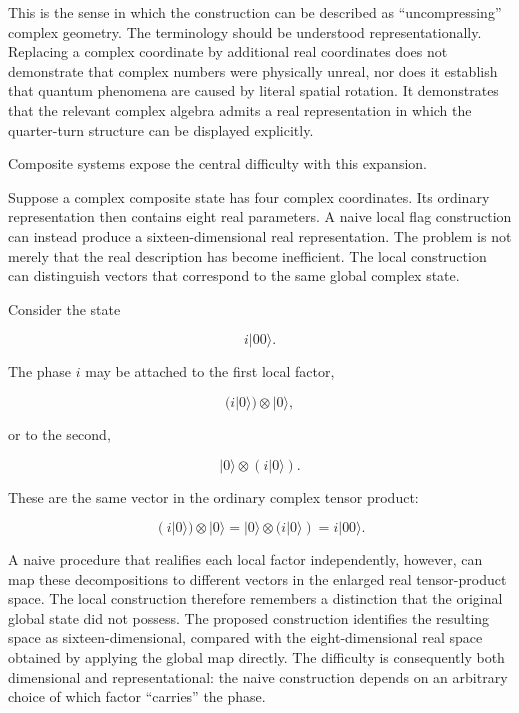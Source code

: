\documentclass[11pt]{article}
\begin{document}
This is the sense in which the construction can be described as ``uncompressing'' complex geometry. The terminology should be understood representationally. Replacing a complex coordinate by additional real coordinates does not demonstrate that complex numbers were physically unreal, nor does it establish that quantum phenomena are caused by literal spatial rotation. It demonstrates that the relevant complex algebra admits a real representation in which the quarter-turn structure can be displayed explicitly.

Composite systems expose the central difficulty with this expansion.

Suppose a complex composite state has four complex coordinates. Its ordinary representation then contains eight real parameters. A naive local flag construction can instead produce a sixteen-dimensional real representation. The problem is not merely that the real description has become inefficient. The local construction can distinguish vectors that correspond to the same global complex state.

Consider the state

\begin{equation}
i|00\rangle.
\end{equation}

The phase $i$ may be attached to the first local factor,

\begin{equation}
(i|0\rangle)\otimes|0\rangle,
\end{equation}

or to the second,

\begin{equation}
|0\rangle\otimes(i|0\rangle).
\end{equation}

These are the same vector in the ordinary complex tensor product:

\begin{equation}
(i|0\rangle)\otimes|0\rangle
=
|0\rangle\otimes(i|0\rangle)
=
i|00\rangle.
\end{equation}

A naive procedure that realifies each local factor independently, however, can map these decompositions to different vectors in the enlarged real tensor-product space. The local construction therefore remembers a distinction that the original global state did not possess. The proposed construction identifies the resulting space as sixteen-dimensional, compared with the eight-dimensional real space obtained by applying the global map directly. The difficulty is consequently both dimensional and representational: the naive construction depends on an arbitrary choice of which factor ``carries'' the phase.
\end{document}
